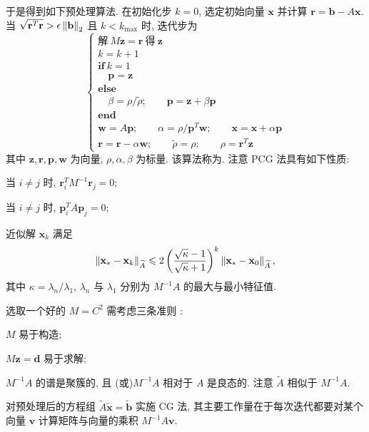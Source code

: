 于是得到如下预处理算法. 在初始化步 $k=0$, 选定初始向量 $\mathbf{x}$ 并计算 $\mathbf{r}=\mathbf{b}-A\mathbf{x}$. 当 $\sqrt{\mathbf{r}^T\mathbf{r}}>\epsilon\left\|\mathbf{b}\right\|_2$ 且 $k<k_{\max}$ 时, 迭代步为
\[
  \left\{
  \begin{array}{l}
    \text{解}\ M\mathbf{z}=\mathbf{r}\ \text{得}\ \mathbf{z}\\
    k=k+1\\
    \textbf{if}\ k=1\\
    \quad \mathbf{p}=\mathbf{z}\\
    \textbf{else}\\
    \quad \beta=\rho/\tilde{\rho};\qquad \mathbf{p}=\mathbf{z}+\beta\mathbf{p}\\
    \textbf{end}\\
    \mathbf{w}=A\mathbf{p};\qquad
    \alpha=\rho/\mathbf{p}^T\mathbf{w};\qquad
    \mathbf{x}=\mathbf{x}+\alpha\mathbf{p}\\
    \mathbf{r}=\mathbf{r}-\alpha\mathbf{w};\qquad
    \tilde{\rho}=\rho;\qquad
    \rho=\mathbf{r}^T\mathbf{z}
  \end{array}
  \right.
\]
其中 $\mathbf{z},\mathbf{r},\mathbf{p},\mathbf{w}$ 为向量, $\rho,\alpha,\beta$ 为标量. 该算法称为. 注意 PCG 法具有如下性质:
\begin{romanlist}
  \item 当 $i\neq j$ 时, $\mathbf{r}_i^TM^{-1}\mathbf{r}_j=0$;
  \item 当 $i\neq j$ 时, $\mathbf{p}_i^TA\mathbf{p}_j=0$;
  \item 近似解 $\mathbf{x}_k$ 满足
    \[
      \left\|\mathbf{x}_*-\mathbf{x}_k\right\|_{\widetilde{A}}
      \leqslant2\left(\frac{\sqrt{\kappa}-1}{\sqrt{\kappa}+1}\right)^k
      \left\|\mathbf{x}_*-\mathbf{x}_0\right\|_{\widetilde{A}},
    \]
    其中 $\kappa=\lambda_n/\lambda_1$, $\lambda_n$ 与 $\lambda_1$ 分别为 $M^{-1}A$ 的最大与最小特征值.
\end{romanlist}

选取一个好的 $M=C^2$ 需考虑三条准则 \cite{src:2,src:16,src:32,src:42,src:43}:
\begin{parenlist}
  \item $M$ 易于构造;
  \item $M\mathbf{z}=\mathbf{d}$ 易于求解;
  \item $M^{-1}A$ 的谱是聚簇的, 且 (或)$M^{-1}A$ 相对于 $A$ 是良态的. 注意 $\widetilde{A}$ 相似于 $M^{-1}A$.
\end{parenlist}
对预处理后的方程组 $\widetilde{A}\tilde{\mathbf{x}}=\tilde{\mathbf{b}}$ 实施 CG 法, 其主要工作量在于每次迭代都要对某个向量 $\mathbf{v}$ 计算矩阵与向量的乘积 $M^{-1}A\mathbf{v}$.

